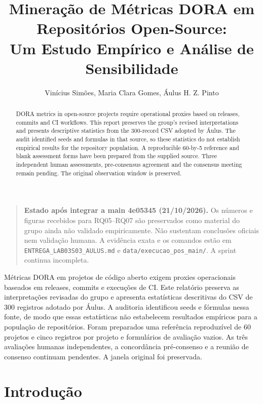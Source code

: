 \documentclass[12pt]{article}
\title{Mineração de Métricas DORA em Repositórios Open-Source:\\Um Estudo Empírico e Análise de Sensibilidade}
\author{Vinícius Simões\inst{1}, Maria Clara Gomes\inst{1}, Áulus H. Z. Pinto\inst{1}}
\begin{document}
 

\maketitle
\begin{quote}
\textbf{Estado após integrar a main 4e05345 (21/10/2026).}
Os números e figuras recebidos para RQ05--RQ07 são preservados como material do grupo ainda não validado empiricamente. Não sustentam conclusões oficiais nem validação humana. A evidência exata e os comandos estão em \texttt{ENTREGA\_LAB03S03\_AULUS.md} e \texttt{data/execucao\_pos\_main/}. A sprint continua incompleta.
\end{quote}

\begin{abstract}
  DORA metrics in open-source projects require operational proxies based on releases, commits and CI workflows. This report preserves the group's revised interpretations and presents descriptive statistics from the 300-record CSV adopted by Áulus. The audit identified seeds and formulas in that source, so these statistics do not establish empirical results for the repository population. A reproducible 60-by-5 reference and blank assessment forms have been prepared from the supplied source. Three independent human assessments, pre-consensus agreement and the consensus meeting remain pending. The original observation window is preserved.
\end{abstract}

\begin{resumo}
  Métricas DORA em projetos de código aberto exigem proxies operacionais baseados em releases, commits e execuções de CI. Este relatório preserva as interpretações revisadas do grupo e apresenta estatísticas descritivas do CSV de 300 registros adotado por Áulus. A auditoria identificou seeds e fórmulas nessa fonte, de modo que essas estatísticas não estabelecem resultados empíricos para a população de repositórios. Foram preparados uma referência reproduzível de 60 projetos e cinco registros por projeto e formulários de avaliação vazios. As três avaliações humanas independentes, a concordância pré-consenso e a reunião de consenso continuam pendentes. A janela original foi preservada.
\end{resumo} 

\section{Introdução}
\end{document}
